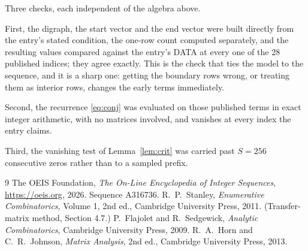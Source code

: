 \documentclass[11pt,a4paper]{article}
\theoremstyle{plain}
\theoremstyle{definition}
\begin{document}
Three checks, each independent of the algebra above.

First, the digraph, the start vector and the end vector were built directly from the
entry's stated condition, the one-row count computed separately, and the resulting values
compared against the entry's DATA at every one of the $28$ published indices; they
agree exactly. This is the check that ties the model to the sequence, and it is a sharp one:
getting the boundary rows wrong, or treating them as interior rows, changes the early terms
immediately.

Second, the recurrence \eqref{eq:conj} was evaluated on those published terms in exact
integer arithmetic, with no matrices involved, and vanishes at every index the entry claims.

Third, the vanishing test of Lemma~\ref{lem:crit} was carried past $S=256$ consecutive
zeros rather than to a sampled prefix.

\begin{thebibliography}{9}
 The OEIS Foundation, \emph{The On-Line Encyclopedia of Integer
Sequences}, \url{https://oeis.org}, 2026. Sequence A316736.
 R.~P.~Stanley, \emph{Enumerative Combinatorics}, Volume 1, 2nd ed.,
Cambridge University Press, 2011. (Transfer-matrix method, Section 4.7.)
 P.~Flajolet and R.~Sedgewick, \emph{Analytic Combinatorics}, Cambridge
University Press, 2009.
 R.~A.~Horn and C.~R.~Johnson, \emph{Matrix Analysis}, 2nd ed., Cambridge
University Press, 2013.
\end{thebibliography}
\end{document}
